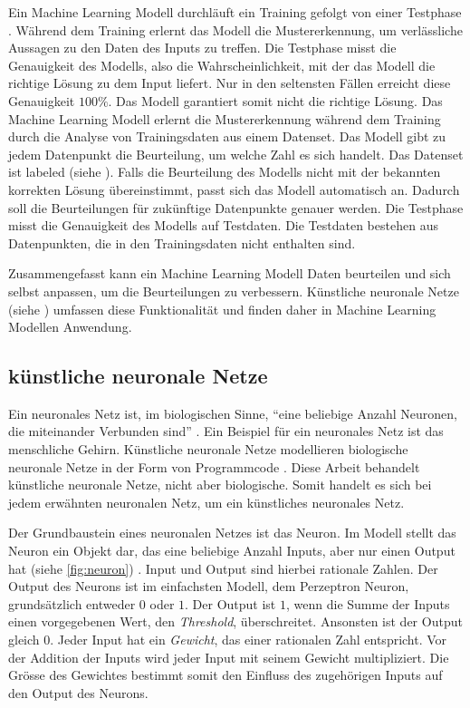 Ein Machine Learning Modell durchläuft ein Training gefolgt von einer Testphase
\cite{noauthor_training_nodate}. Während dem Training erlernt das Modell die
Mustererkennung, um verlässliche Aussagen zu den Daten des Inputs zu treffen.
Die Testphase misst die Genauigkeit des Modells, also die Wahrscheinlichkeit,
mit der das Modell die richtige Lösung zu dem Input liefert. Nur in den seltensten
Fällen erreicht diese Genauigkeit $100\%$. Das Modell garantiert somit nicht die
richtige Lösung. Das Machine Learning Modell erlernt die Mustererkennung während
dem Training durch die Analyse von Trainingsdaten aus einem Datenset. Das Modell
gibt zu jedem Datenpunkt die Beurteilung, um welche Zahl es sich handelt. Das
Datenset ist labeled (siehe ). Falls die Beurteilung des
Modells nicht mit der bekannten korrekten Lösung übereinstimmt, passt sich das
Modell automatisch an. Dadurch soll die Beurteilungen für zukünftige Datenpunkte
genauer werden. Die Testphase misst die Genauigkeit des Modells auf Testdaten.
Die Testdaten bestehen aus Datenpunkten, die in den Trainingsdaten nicht
enthalten sind.
 
Zusammengefasst kann ein Machine Learning Modell Daten beurteilen und sich
selbst anpassen, um die Beurteilungen zu verbessern. Künstliche neuronale Netze
(siehe ) umfassen diese Funktionalität und finden daher in
Machine Learning Modellen Anwendung.
 
\subsection{künstliche neuronale Netze}\label{sub:t_ml_nn} Ein neuronales Netz
ist, im biologischen Sinne, ``eine beliebige Anzahl Neuronen, die miteinander
Verbunden sind'' \cite{noauthor_neuronales_2021}. Ein Beispiel für ein neuronales
Netz ist das menschliche Gehirn. Künstliche neuronale Netze modellieren
biologische neuronale Netze in der Form von Programmcode
\cite{noauthor_artificial_nodate}. Diese Arbeit behandelt künstliche neuronale
Netze, nicht aber biologische. Somit handelt es sich bei jedem erwähnten
neuronalen Netz, um ein künstliches neuronales Netz.
 
Der Grundbaustein eines neuronalen Netzes ist das Neuron. Im Modell stellt das
Neuron ein Objekt dar, das eine beliebige Anzahl Inputs, aber nur einen Output
hat (siehe \autoref{fig:neuron}) \cite{pramoditha_concept_2021}. Input und
Output sind hierbei rationale Zahlen. Der Output des Neurons ist im einfachsten
Modell, dem Perzeptron Neuron, grundsätzlich entweder $0$ oder $1$. Der Output ist
$1$, wenn die Summe der Inputs einen vorgegebenen Wert, den \emph{Threshold},
überschreitet. Ansonsten ist der Output gleich $0$. Jeder Input hat ein
\emph{Gewicht}, das einer rationalen Zahl entspricht. Vor der Addition der
Inputs wird jeder Input mit seinem Gewicht multipliziert. Die Grösse des
Gewichtes bestimmt somit den Einfluss des zugehörigen Inputs auf den Output des
Neurons. \cite{nielsen_neural_2015}\cite{simplilearn_what_2021}
 
